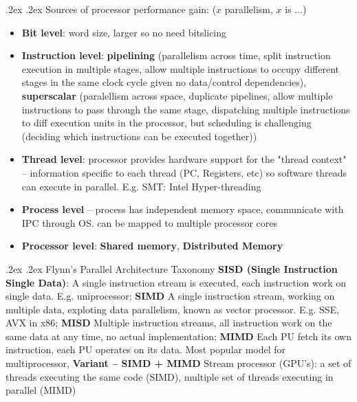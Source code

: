 \documentclass[10pt,landscape,a4paper]{article}
\makeatletter
\renewcommand{\subsection}{\@startsection{subsection}{1}{0mm}%
  {.2ex}%
  {.2ex}%
{\sffamily\bfseries}}
\makeatother
\begin{document}
\begin{multicols*}{4}
   \subsection{Sources of processor performance gain: ($x$ parallelism, $x$ is ...)}
    \begin{itemize}
      \item \textbf{Bit level}: word size, larger so no need bitslicing
      \item \textbf{Instruction level}: \textbf{pipelining} (parallelism across time, split instruction execution in multiple stages, allow multiple instructions to occupy different stages in the same clock cycle given no data/control dependencies), \textbf{superscalar} (paralellism across space, duplicate pipelines, allow multiple instructions to pass through the same stage, dispatching multiple instructions to diff execution units in the processor, but scheduling is challenging (deciding which instructions can be executed together))
      \item \textbf{Thread level}: processor provides hardware support for the "thread context" -- information specific to each thread (PC, Registers, etc) so software threads can execute in parallel. E.g. SMT: Intel Hyper-threading
      \item \textbf{Process level} -- process has independent memory space, communicate with IPC through OS. can be mapped to multiple processor cores
      \item \textbf{Processor level}: \textbf{Shared memory}, \textbf{Distributed Memory}
    \end{itemize}
  \subsection{Flynn's Parallel Architecture Taxonomy}
  \textbf{SISD (Single Instruction Single Data)}: A single instruction stream is executed, each instruction work on single data. E.g. uniprocessor; \textbf{SIMD}
  A single instruction stream, working on multiple data, exploting data parallelism, known as vector processor. E.g. SSE, AVX in x86; \textbf{MISD}
  Multiple instruction streams, all instruction work on the same data at any time, no actual implementation; \textbf{MIMD} Each PU fetch its own instruction, each PU operates on its data. Most popular model for multiprocessor, \textbf{Variant -- SIMD + MIMD}
  Stream processor (GPU's): a set of threads executing the same code (SIMD), multiple set of threads executing in parallel (MIMD)

\end{multicols*}
\end{document}
